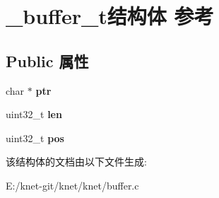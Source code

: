 \hypertarget{struct__buffer__t}{}\section{\+\_\+buffer\+\_\+t结构体 参考}
\label{struct__buffer__t}
\subsection*{Public 属性}
\begin{DoxyCompactItemize}
\item 
\hypertarget{struct__buffer__t_a906d46beefad22b8bebb76b2977827ab}{}char $\ast$ {\bfseries ptr}\label{struct__buffer__t_a906d46beefad22b8bebb76b2977827ab}

\item 
\hypertarget{struct__buffer__t_abd5fe4879cdd36bb90bb04798280551c}{}uint32\+\_\+t {\bfseries len}\label{struct__buffer__t_abd5fe4879cdd36bb90bb04798280551c}

\item 
\hypertarget{struct__buffer__t_a472a73ec25879c79d70a69da7ac4ef05}{}uint32\+\_\+t {\bfseries pos}\label{struct__buffer__t_a472a73ec25879c79d70a69da7ac4ef05}

\end{DoxyCompactItemize}


该结构体的文档由以下文件生成\+:\begin{DoxyCompactItemize}
\item 
E\+:/knet-\/git/knet/knet/buffer.\+c\end{DoxyCompactItemize}
